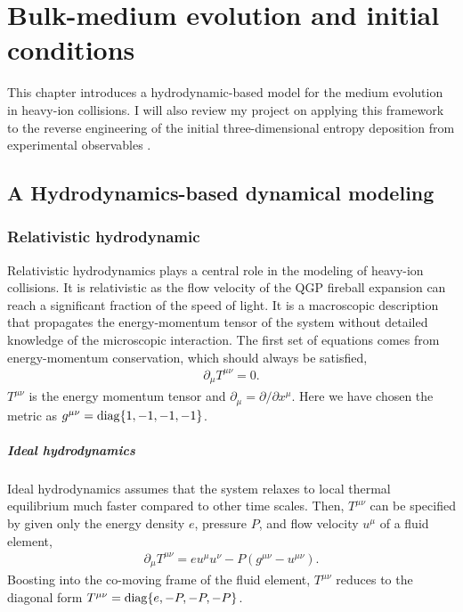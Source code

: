 \chapter{Bulk-medium evolution and initial conditions}
\label{chapter:simulation}
This chapter introduces a hydrodynamic-based model for the medium evolution in heavy-ion collisions.
I will also review my project on applying this framework to the reverse engineering of the initial three-dimensional entropy deposition from experimental observables \cite{PhysRevC.96.044912}.

\section{A Hydrodynamics-based dynamical modeling}
\subsection{Relativistic hydrodynamic}
Relativistic hydrodynamics plays a central role in the modeling of heavy-ion collisions.
It is relativistic as the flow velocity of the QGP fireball expansion can reach a significant fraction of the speed of light.
It is a macroscopic description that propagates the energy-momentum tensor of the system without detailed knowledge of the microscopic interaction.
The first set of equations comes from energy-momentum conservation, which should always be satisfied,
\begin{eqnarray}\label{eq:hydro:0-4}
\partial_\mu T^{\mu\nu} = 0.
\end{eqnarray}
$T^{\mu\nu}$ is the energy momentum tensor and $\partial_\mu = \partial/\partial x^\mu$. 
Here we have chosen the metric as $g^{\mu\nu} = \operatorname{diag}\{1, -1, -1, -1\}$.

\paragraph{Ideal hydrodynamics} Ideal hydrodynamics assumes that the system relaxes to local thermal equilibrium much faster compared to other time scales. Then, $T^{\mu\nu}$ can be specified by given only the energy density $e$, pressure $P$, and flow velocity $u^\mu$ of a fluid element,
\begin{eqnarray}
\partial_\mu T^{\mu\nu} = e u^\mu u^\nu - P (g^{\mu\nu}-u^{\mu\nu}).
\end{eqnarray}
Boosting into the co-moving frame of the fluid element, $T^{\mu\nu}$ reduces to the diagonal form $T^{\mu\nu} = \operatorname{diag}\{e, -P, -P, -P\}$.

